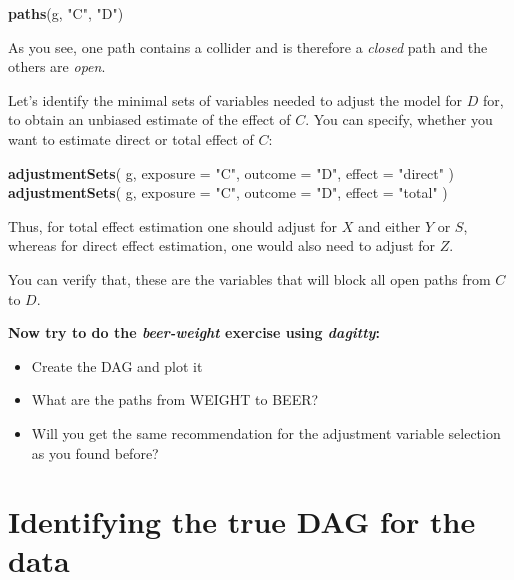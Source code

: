 \documentclass[
]{book}
\newenvironment{Shaded}{\begin{snugshade}}{\end{snugshade}}
\newcommand{\AttributeTok}[1]{\textcolor[rgb]{0.13,0.29,0.53}{#1}}
\newcommand{\FunctionTok}[1]{\textcolor[rgb]{0.13,0.29,0.53}{\textbf{#1}}}
\newcommand{\NormalTok}[1]{#1}
\newcommand{\StringTok}[1]{\textcolor[rgb]{0.31,0.60,0.02}{#1}}
\begin{document}
\begin{Shaded}
\begin{Highlighting}[]
\FunctionTok{paths}\NormalTok{(g, }\StringTok{"C"}\NormalTok{, }\StringTok{"D"}\NormalTok{)}
\end{Highlighting}
\end{Shaded}

As you see, one path contains a collider and is therefore a \emph{closed} path and the others are \emph{open}.

Let's identify the minimal sets of variables needed to adjust the model for \(D\) for, to obtain an unbiased estimate of the effect of \(C\). You can specify, whether you want to estimate direct or total effect of \(C\):

\begin{Shaded}
\begin{Highlighting}[]
\FunctionTok{adjustmentSets}\NormalTok{(}
\NormalTok{  g, }\AttributeTok{exposure =} \StringTok{"C"}\NormalTok{, }\AttributeTok{outcome =} \StringTok{"D"}\NormalTok{, }\AttributeTok{effect =} \StringTok{"direct"}
\NormalTok{)}
\FunctionTok{adjustmentSets}\NormalTok{(}
\NormalTok{  g, }\AttributeTok{exposure =} \StringTok{"C"}\NormalTok{, }\AttributeTok{outcome =} \StringTok{"D"}\NormalTok{, }\AttributeTok{effect =} \StringTok{"total"}
\NormalTok{)}
\end{Highlighting}
\end{Shaded}

Thus, for total effect estimation one should adjust for \(X\) and either \(Y\) or \(S\), whereas for direct effect estimation, one would also need to adjust for \(Z\).

You can verify that, these are the variables that will block all open paths from \(C\) to \(D\).

\textbf{Now try to do the \emph{beer-weight} exercise using \emph{dagitty}: }

\begin{itemize}
\item
  Create the DAG and plot it
\item
  What are the paths from WEIGHT to BEER?
\item
  Will you get the same recommendation for the adjustment variable selection as you found before?
\end{itemize}

\section{Identifying the true DAG for the data}\label{identifying-the-true-dag-for-the-data}
\end{document}
